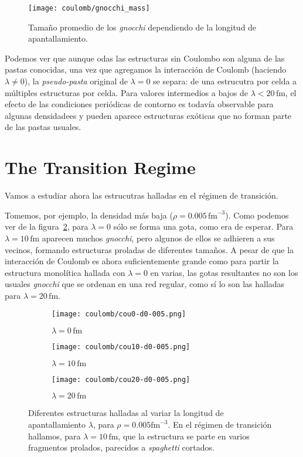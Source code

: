 \begin{figure}[h] %
\centering
\texttt{[image: coulomb/gnocchi\_mass]}
\caption{Tamaño promedio de los \emph{gnocchi} dependiendo de la longitud de apantallamiento.}
\label{fig:gnocchi_mass}
\end{figure}

Podemos ver que aunque odas las estructuras sin Coulombo son alguna de las pastas conocidas, una vez que agregamos la interacción de Coulomb (haciendo $\lambda\neq0$), la \emph{pseudo-pasta} original de $\lambda=0$ se separa: de una estrucutra por celda a múltiples estructuras por celda.
Para valores intermedios a bajos de $\lambda < 20\,\text{fm}$, el efecto de las condiciones periódicas de contorno es todavía observable para algunas densidadees y pueden aparece estructuras exóticas que no forman parte de las pastas usuales.

\section{The Transition Regime} \label{transition}

Vamos a estudiar ahora las estrucutras halladas en el régimen de transición.

Tomemos, por ejemplo, la densidad más baja ($\rho=0.005\,\text{fm}^{-3}$).
Como podemos ver de la figura~\ref{fig:gnocchi}, para $\lambda=0$ sólo se forma una gota, como era de esperar.
Para $\lambda=10\,\text{fm}$ aparecen muchos \emph{gnocchi}, pero algunos de ellos se adhieren a sus vecinos, formando estructuras proladas de diferentes tamaños.
A pesar de que la interacción de Coulomb es ahora suficientemente grande como para partir la estructura monolítica hallada con $\lambda=0$ en varias, las gotas resultantes no son los usuales \emph{gnocchi} que se ordenan en una red regular, como sí lo son las halladas para $\lambda=20\,\text{fm}$.

\begin{figure}[h!]  \centering
  \begin{subfigure}[h!]{0.25\columnwidth}
    \centering
    \texttt{[image: coulomb/cou0-d0-005.png]}
    \caption{$\lambda=0\,\text{fm}$}
  \end{subfigure}
  \begin{subfigure}[h!]{0.25\columnwidth}
    \centering
    \texttt{[image: coulomb/cou10-d0-005.png]}
    \caption{$\lambda=10\,\text{fm}$}
  \end{subfigure}
  \begin{subfigure}[h!]{0.25\columnwidth}
    \centering
    \texttt{[image: coulomb/cou20-d0-005.png]}
    \caption{$\lambda=20\,\text{fm}$}
  \end{subfigure}
  \caption{Diferentes estructuras halladas al variar la longitud de apantallamiento $\lambda$, para $\rho=0.005\text{fm}^{-3}$.
    En el régimen de transición hallamos, para $\lambda=10\,\text{fm}$, que la estructura se parte en varios fragmentos prolados, parecidos a \emph{spaghetti} cortados.}
  \label{fig:gnocchi}
\end{figure}


